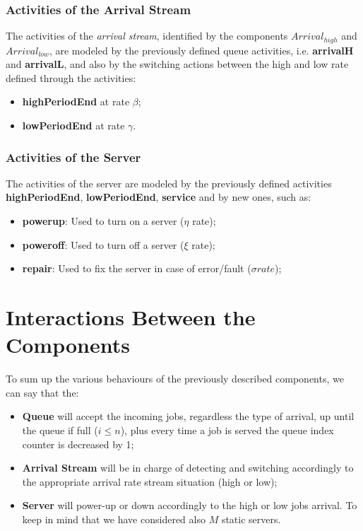 \documentclass{article}
\begin{document}
\subsubsection{Activities of the Arrival Stream}
The activities of the \textit{arrival stream},  identified by the components \(Arrival_{high}\) and \(Arrival_{low}\), are modeled by the previously defined queue activities, i.e. \textbf{arrivalH} and \textbf{arrivalL}, and also by the switching actions between the high and low rate defined through the activities:

\begin{itemize}
    \item \textbf{highPeriodEnd} at rate \(\beta\);
    \item \textbf{lowPeriodEnd} at rate \(\gamma\).
\end{itemize}

\subsubsection{Activities of the Server}
The activities of the server are modeled by the previously defined activities \textbf{highPeriodEnd}, \textbf{lowPeriodEnd}, \textbf{service} and by new ones, such as:

\begin{itemize}
    \item \textbf{powerup}: Used to turn on a server (\(\eta\) rate);
    \item \textbf{poweroff}: Used to turn off a server (\(\xi\) rate);
    \item \textbf{repair}: Used to fix the server in case of error/fault (\(\sigma  rate\));
\end{itemize}

\section{Interactions Between the Components}

To sum up the various behaviours of the previously described components, we can say that the:

\begin{itemize}
    \item \textbf{Queue} will accept the incoming jobs, regardless the type of arrival, up until the queue if full (\(i \leq n\)), plus every time a job is served the queue index counter is decreased by 1;
    \item \textbf{Arrival Stream} will be in charge of detecting and switching accordingly to the appropriate arrival rate stream situation (high or low);
    \item \textbf{Server} will power-up or down accordingly to the high or low jobs arrival. To keep in mind that we have considered also \(M\) static servers.
\end{itemize}
\end{document}

